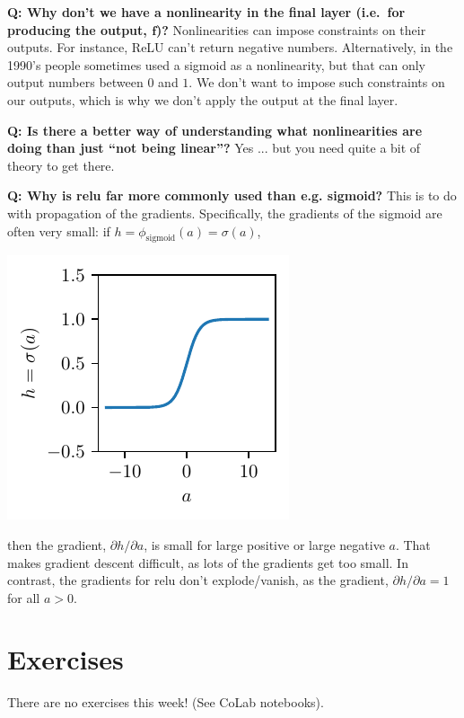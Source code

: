 \documentclass{article}
\newcommand{\f}{\mathbf{f}}
\begin{document}
\textbf{Q: Why don't we have a nonlinearity in the final layer (i.e.\ for producing the output, $\f$)?}
Nonlinearities can impose constraints on their outputs.
For instance, ReLU can't return negative numbers.
Alternatively, in the 1990's people sometimes used a sigmoid as a nonlinearity, but that can only output numbers between $0$ and $1$.
We don't want to impose such constraints on our outputs, which is why we don't apply the output at the final layer.

\textbf{Q: Is there a better way of understanding what nonlinearities are doing than just ``not being linear''?}
Yes ... but you need quite a bit of theory to get there.

\textbf{Q: Why is relu far more commonly used than e.g. sigmoid?}
This is to do with propagation of the gradients.
Specifically, the gradients of the sigmoid are often very small: if $h = \phi_\text{sigmoid}(a) = \sigma(a)$, 
\begin{center}
  \includegraphics{sigmoid}
\end{center}
then the gradient, $\partial h / \partial a$, is small for large positive or large negative $a$.
That makes gradient descent difficult, as lots of the gradients get too small.
In contrast, the gradients for relu don't explode/vanish, as the gradient, $\partial h / \partial a = 1$ for all $a>0$.

\section{Exercises}

There are no exercises this week!  (See CoLab notebooks).
\end{document}
